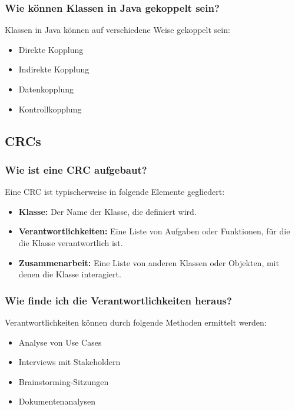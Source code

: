 \documentclass[main.tex]{subfiles}
\begin{document}
\subsubsection*{Wie können Klassen in Java gekoppelt sein?}
Klassen in Java können auf verschiedene Weise gekoppelt sein:
\begin{itemize}
    \item  \gls{Direkte Kopplung}
    \item  \gls{Indirekte Kopplung}
    \item Datenkopplung
    \item Kontrollkopplung
\end{itemize}

\subsection{\glspl{CRC} }
\subsubsection*{Wie ist eine \gls{CRC}  aufgebaut?}
Eine \gls{CRC}  ist typischerweise in folgende Elemente gegliedert:
\begin{itemize}
    \item \textbf{Klasse:} Der Name der Klasse, die definiert wird.
    \item \textbf{Verantwortlichkeiten:} Eine Liste von Aufgaben oder Funktionen, für die die Klasse verantwortlich ist.
    \item \textbf{Zusammenarbeit:} Eine Liste von anderen Klassen oder Objekten, mit denen die Klasse interagiert.
\end{itemize}

\subsubsection*{Wie finde ich die Verantwortlichkeiten heraus?}
Verantwortlichkeiten können durch folgende Methoden ermittelt werden:
\begin{itemize}
    \item Analyse von \glspl{Use Case}
    \item Interviews mit Stakeholdern
    \item Brainstorming-Sitzungen
    \item Dokumentenanalysen
\end{itemize}
\end{document}
